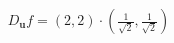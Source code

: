 \documentclass[preview]{standalone}
\begin{document}
\begin{align*}
D_{\mathbf{u}} f = (2, 2) \cdot \left( \frac{1}{\sqrt{2}}, \frac{1}{\sqrt{2}} \right)
\end{align*}
\end{document}
